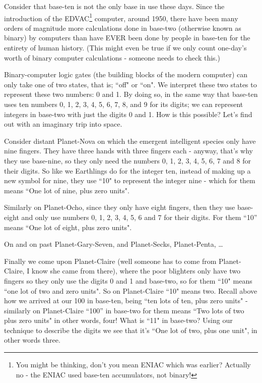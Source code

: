 \documentclass{article}
\begin{document}
\bigskip
Consider that base-ten is not the only base in use these days.
Since the introduction of the EDVAC\footnote{You might be thinking, don't you
mean ENIAC which was earlier? Actually no - the ENIAC
used base-ten accumulators, not binary!} computer, around 1950,
there have been many orders of magnitude more calculations done
in base-two (otherwise known as binary) by computers than have EVER
been done by people in base-ten for the entirety of human history.
(This might even be true if we only count one-day's worth of
binary computer calculations - someone needs to check this.)

Binary-computer logic gates (the building blocks of the modern computer)
can only take one of two states, that is; ``off" or ``on".
We interpret these two states to represent these two numbers: 0 and 1.
By doing so, in the same way that base-ten uses ten numbers 0,
1, 2, 3, 4, 5, 6, 7, 8, and 9 for its digits; we can represent integers
in base-two with just the digits 0 and 1. How is this possible?
Let's find out with an imaginary trip into space.

Consider distant Planet-Nova on which the emergent
intelligent species only have nine fingers.
They have three hands with three fingers each - anyway,
that's why they use base-nine, so they only need the numbers 0,
1, 2, 3, 4, 5, 6, 7 and 8 for their digits.
So like we Earthlings do for the integer ten,
instead of making up a new symbol for nine,
they use ``10" to represent the integer nine - which
for them means ``One lot of nine, plus zero units".

Similarly on Planet-Ocho, since they only have eight fingers,
then they use base-eight and only use numbers 0, 1,
2, 3, 4, 5, 6 and 7 for their digits. For them ``10''
means ``One lot of eight, plus zero units".

On and on past Planet-Gary-Seven, and Planet-Secks, Planet-Penta, \dots{}

Finally we come upon Planet-Claire (well someone
has to come from Planet-Claire,
I know she came from there),
where the poor blighters only have two fingers
so they only use the digits 0 and 1 and base-two,
so for them ``10" means ``one lot of two and zero units".
So on Planet-Claire ``10" means two.
Recall above how we arrived at our 100 in base-ten,
being ``ten lots of ten,
plus zero units" - similarly on Planet-Claire ``100''
in base-two for them means ``Two lots of two plus zero units" in other words,
four! What is ``11" in base-two? Using our technique to
describe the digits we see that it's ``One lot of two, plus one unit",
in other words three.
\end{document}
